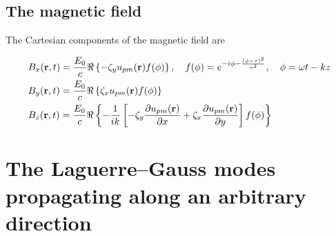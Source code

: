 \subsection{The magnetic field}
The Cartesian components of the magnetic field are
\begin{highlightbox}[title={Cartesian magnetic field}]
    \begin{align}
         & B_x({\bf r},t) = \frac{E_0}c\Re\left\{-\zeta_y u_{pm}({\bf r})f(\phi)\right\},\quad f(\phi)=e^{-i\phi-\frac{(\phi -  \tau)^2 }{\tau^2}},\quad \phi = \omega t-kz                    \\
         & B_y({\bf r},t) = \frac{E_0}c\Re\left\{\zeta_x u_{pm}({\bf r})f(\phi)\right\}                                                                                                        \\
         & B_z({\bf r},t) = \frac{E_0}c\Re\left\{-\frac1{ik}\left[-\zeta_y\frac{\partial u_{pm}({\bf r})}{\partial x}+\zeta_x\frac{\partial u_{pm}({\bf r})}{\partial y}\right]f(\phi)\right\}
    \end{align}
\end{highlightbox}


\section{The Laguerre--Gauss modes propagating along an arbitrary direction}

